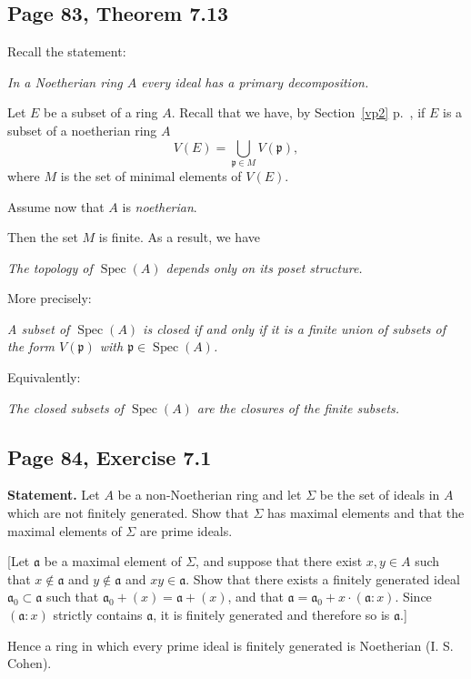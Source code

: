 \documentclass[parskip=half,fontsize=12pt]{scrartcl}%
\newcommand{\mf}{\mathfrak}
\newcommand{\aaa}{\mf a}
\newcommand{\ppp}{\mf p}
\newcommand{\bu}{\bullet}
\newcommand{\Spec}{\operatorname{Spec}}\newcommand{\Sp}{\operatorname{Spec}}
\begin{document}
\subsection{Page 83, Theorem 7.13}%

Recall the statement:

\emph{In a Noetherian ring $A$ every ideal has a primary decomposition.}

Let $E$ be a subset of a ring $A$. Recall that we have, by Section~\ref{vp2} p.~\pageref{vp2}, if $E$ is a subset of a noetherian ring $A$ 
$$
V(E)=\bigcup_{\ppp\in M}V(\ppp),
$$ 
where $M$ is the set of minimal elements of $V(E)$. 

Assume now that $A$ is \emph{noetherian}. 

Then the set $M$ is finite. As a result, we have %

\emph{The topology of $\Spec(A)$ depends only on its poset structure.}

More precisely:

\emph{A subset of $\Spec(A)$ is closed if and only if it is a finite union of subsets of the form $V(\ppp)$ with $\ppp\in\Spec(A)$.}

Equivalently:

\emph{The closed subsets of $\Spec(A)$ are the closures of the finite subsets.}



\subsection{Page 84, Exercise 7.1}%

\textbf{Statement.} Let $A$ be a non-Noetherian ring and let $\Sigma$ be the set of ideals in $A$ which are not finitely generated. Show that $\Sigma$ has maximal elements and that the maximal elements of $\Sigma$ are prime ideals.

[Let $\aaa$ be a maximal element of $\Sigma$, and suppose that there exist $x,y\in A$ such that $x\notin\aaa$ and $y\notin\aaa$ and $xy\in\aaa$. Show that there exists a finitely generated ideal $\aaa_0\subset\aaa$ such that $\aaa_0+(x)=\aaa+(x)$, and that $\aaa=\aaa_0+x\cdot(\aaa:x)$. Since $(\aaa:x)$ strictly contains $\aaa$, it is finitely generated and therefore so is $\aaa$.]

Hence a ring in which every prime ideal is finitely generated is Noetherian (I. S. Cohen).
\end{document}
